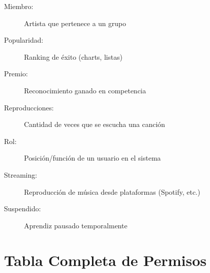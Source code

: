 \documentclass[12pt,a4paper,spanish,oneside]{report}
\begin{document}
\begin{description}
    \item[Miembro:] Artista que pertenece a un grupo
    
    \item[Popularidad:] Ranking de éxito (charts, listas)
    
    \item[Premio:] Reconocimiento ganado en competencia
    
    \item[Reproducciones:] Cantidad de veces que se escucha una canción
    
    \item[Rol:] Posición/función de un usuario en el sistema
    
    \item[Streaming:] Reproducción de música desde plataformas (Spotify, etc.)
    
    \item[Suspendido:] Aprendiz pausado temporalmente
\end{description}

\chapter{Tabla Completa de Permisos}
\end{document}

